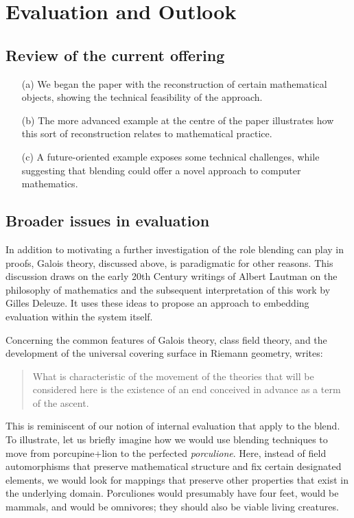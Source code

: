 \section{Evaluation and Outlook}
\label{sec:eval}

\subsection{Review of the current offering}

\begin{itemize}
\item[(a)] We began the paper with the reconstruction of certain
mathematical objects, showing the technical feasibility of the
approach. 
\item[(b)] The more advanced example at the centre of the paper
  illustrates how this sort of reconstruction relates to mathematical
  practice.
\item[(c)] A future-oriented example exposes some technical
  challenges, while suggesting that blending could offer a novel
  approach to computer mathematics.
\end{itemize}

\subsection{Broader issues in evaluation}

In addition to motivating a further investigation of the role blending
can play in proofs, Galois theory, discussed above, is paradigmatic
for other reasons.  This discussion draws on the early 20th Century
writings of Albert Lautman on the philosophy of mathematics and the
subsequent interpretation of this work by Gilles Deleuze.  It uses
these ideas to propose an approach to embedding evaluation within the
system itself.

Concerning the common features of Galois theory, class field theory,
and the development of the universal covering surface in Riemann
geometry, \cite[p. 126]{lautman2011mathematics} writes:
\begin{quote}
What is characteristic of the movement of the theories that will be
considered here is the existence of an end conceived in advance as a
term of the ascent.
\end{quote}

This is reminiscent of our notion of internal evaluation that apply to
the blend.  To illustrate, let us briefly imagine how we would use
blending techniques to move from porcupine+lion to the perfected
\emph{porculione}.  Here, instead of field automorphisms that preserve
mathematical structure and fix certain designated elements, we would
look for mappings that preserve other properties that exist in the
underlying domain.  Porculiones would presumably have four feet, would
be mammals, and would be omnivores; they should also be viable living
creatures.

